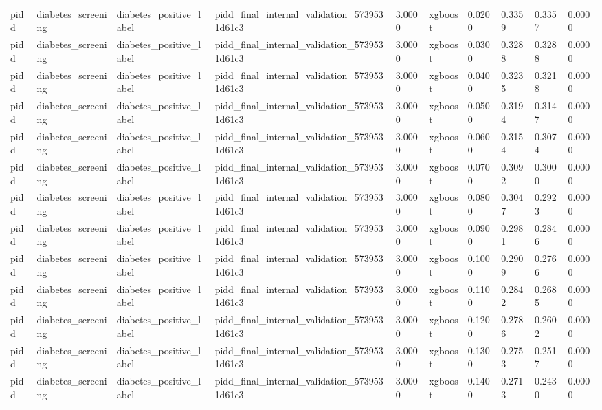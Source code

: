 \begin{tabular}{llllllllll}
pidd & diabetes\_screening & diabetes\_positive\_label & pidd\_final\_internal\_validation\_5739531d61c3 & 3.0000 & xgboost & 0.0200 & 0.3359 & 0.3357 & 0.0000 \\
pidd & diabetes\_screening & diabetes\_positive\_label & pidd\_final\_internal\_validation\_5739531d61c3 & 3.0000 & xgboost & 0.0300 & 0.3288 & 0.3288 & 0.0000 \\
pidd & diabetes\_screening & diabetes\_positive\_label & pidd\_final\_internal\_validation\_5739531d61c3 & 3.0000 & xgboost & 0.0400 & 0.3235 & 0.3218 & 0.0000 \\
pidd & diabetes\_screening & diabetes\_positive\_label & pidd\_final\_internal\_validation\_5739531d61c3 & 3.0000 & xgboost & 0.0500 & 0.3194 & 0.3147 & 0.0000 \\
pidd & diabetes\_screening & diabetes\_positive\_label & pidd\_final\_internal\_validation\_5739531d61c3 & 3.0000 & xgboost & 0.0600 & 0.3154 & 0.3074 & 0.0000 \\
pidd & diabetes\_screening & diabetes\_positive\_label & pidd\_final\_internal\_validation\_5739531d61c3 & 3.0000 & xgboost & 0.0700 & 0.3092 & 0.3000 & 0.0000 \\
pidd & diabetes\_screening & diabetes\_positive\_label & pidd\_final\_internal\_validation\_5739531d61c3 & 3.0000 & xgboost & 0.0800 & 0.3047 & 0.2923 & 0.0000 \\
pidd & diabetes\_screening & diabetes\_positive\_label & pidd\_final\_internal\_validation\_5739531d61c3 & 3.0000 & xgboost & 0.0900 & 0.2981 & 0.2846 & 0.0000 \\
pidd & diabetes\_screening & diabetes\_positive\_label & pidd\_final\_internal\_validation\_5739531d61c3 & 3.0000 & xgboost & 0.1000 & 0.2909 & 0.2766 & 0.0000 \\
pidd & diabetes\_screening & diabetes\_positive\_label & pidd\_final\_internal\_validation\_5739531d61c3 & 3.0000 & xgboost & 0.1100 & 0.2842 & 0.2685 & 0.0000 \\
pidd & diabetes\_screening & diabetes\_positive\_label & pidd\_final\_internal\_validation\_5739531d61c3 & 3.0000 & xgboost & 0.1200 & 0.2786 & 0.2602 & 0.0000 \\
pidd & diabetes\_screening & diabetes\_positive\_label & pidd\_final\_internal\_validation\_5739531d61c3 & 3.0000 & xgboost & 0.1300 & 0.2753 & 0.2517 & 0.0000 \\
pidd & diabetes\_screening & diabetes\_positive\_label & pidd\_final\_internal\_validation\_5739531d61c3 & 3.0000 & xgboost & 0.1400 & 0.2713 & 0.2430 & 0.0000 \\

\end{tabular}
